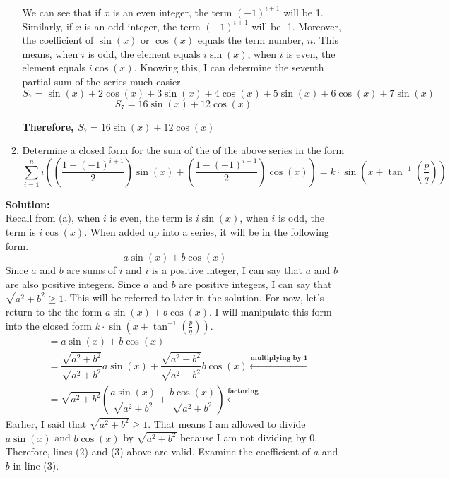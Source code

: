 \documentclass[12pt]{book}
\begin{document}
\begin{enumerate}
\begin{enumerate}
We can see that if $x$ is an even integer, the term $(-1)^{i+1}$ will be 1. Similarly, if $x$ is an odd integer, the term $(-1)^{i+1}$ will be -1. Moreover, the coefficient of $\sin(x)$ or $\cos(x)$ equals the term number, $n$. This means, when $i$ is odd, the element equals $i\sin(x)$, when $i$ is even, the element equals $i\cos(x)$. Knowing this, I can determine the seventh partial sum of the series much easier.\\
$$S_7 = \sin(x) + 2\cos(x) + 3\sin(x) + 4\cos(x) + 5\sin(x) + 6\cos(x) + 7\sin(x)$$
$$S_7 = 16\sin(x) + 12\cos(x)$$

\textbf{Therefore, $S_7 = 16\sin(x) + 12\cos(x)$}

\item Determine a closed form for the sum of the of the above series in the form $$\sum\limits_{i=1}^{n} i\left(\left(\dfrac{1+(-1)^{i+1}}{2}\right)\sin(x) + \left(\dfrac{1-(-1)^{i+1}}{2}\right)\cos(x)\right) = k \cdot \sin\left(x+\tan^{-1}\left(\frac{p}{q}\right)\right)$$
\end{enumerate}

\textbf{Solution:}\\
Recall from (a), when $i$ is even, the term is $i\sin(x)$, when $i$ is odd, the term is $i\cos(x)$. When added up into a series, it will be in the following form.
$$a\sin(x) + b\cos(x)$$
Since $a$ and $b$ are sums of $i$ and $i$ is a positive integer, I can say that $a$ and $b$ are also positive integers. Since $a$ and $b$ are positive integers, I can say that $\sqrt{a^2 + b^2} \geq 1$. This will be referred to later in the solution. For now, let's return to the the form $a\sin(x) + b\cos(x)$. I will manipulate this form into the closed form $k \cdot \sin\left(x+\tan^{-1}\left(\frac{p}{q}\right)\right)$.
\setcounter{equation}{0}
\begin{align}
    &= a\sin(x)+b\cos(x)\\
    &= \dfrac{\sqrt{a^2 + b^2}}{\sqrt{a^2 + b^2}}a\sin(x)+\dfrac{\sqrt{a^2 + b^2}}{\sqrt{a^2 + b^2}}b\cos(x) \xleftarrow[]{\textbf{multiplying by 1}}\\
    &= \sqrt{a^2 + b^2}\left(\dfrac{a\sin(x)}{\sqrt{a^2 + b^2}} + \dfrac{b\cos(x)}{\sqrt{a^2 + b^2}} \right) \xleftarrow[]{\textbf{factoring}}
\end{align}
Earlier, I said that $\sqrt{a^2 + b^2} \geq 1$. That means I am allowed to divide $a\sin(x)$ and $b\cos(x)$ by $\sqrt{a^2 + b^2}$ because I am not dividing by 0. Therefore, lines (2) and (3) above are valid.
Examine the coefficient of $a$ and $b$ in line (3).\\


\end{enumerate}
\end{document}
